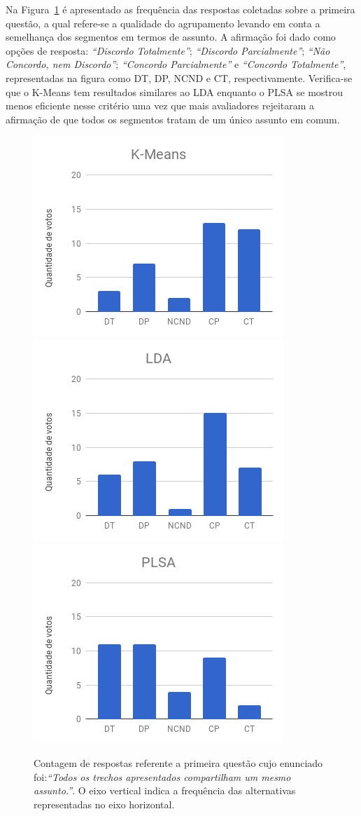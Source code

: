 Na Figura~\ref{fig:Q1} é apresentado as frequência das respostas coletadas sobre a primeira questão, 
a qual refere-se a qualidade do agrupamento levando em conta a semelhança dos segmentos em termos de assunto. A afirmação foi dado como opções de resposta: 
\textit{``Discordo Totalmente''}; 
\textit{``Discordo Parcialmente''}; 
\textit{``Não Concordo, nem Discordo''}; 
\textit{``Concordo Parcialmente''} e 
\textit{``Concordo Totalmente''}, 
representadas na figura como DT, DP, NCND e CT, respectivamente.
Verifica-se que o K-Means tem resultados similares ao LDA enquanto o PLSA se mostrou menos eficiente nesse critério uma vez que mais avaliadores rejeitaram a afirmação de que todos os segmentos tratam de um único assunto em comum. 





\begin{figure}[!h] \centering     %
		\includegraphics[width=.31\textwidth]{conteudo/capitulos/figs/figuras-experimento/Q1-KMeans.png}
		\includegraphics[width=.31\textwidth]{conteudo/capitulos/figs/figuras-experimento/Q1-LDA.png}
		\includegraphics[width=.31\textwidth]{conteudo/capitulos/figs/figuras-experimento/Q1-PLSA.png}
	\caption{Contagem de respostas referente a primeira questão cujo enunciado foi:\textit{``Todos os trechos apresentados compartilham um mesmo assunto.''}. O eixo vertical indica a frequência das alternativas representadas no eixo horizontal. }
	\label{fig:Q1}
\end{figure}







